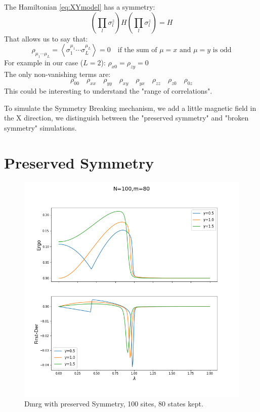 \documentclass[12pt,a4paper]{book}
\theoremstyle{definition}
\begin{document}
The Hamiltonian \ref{eq:XYmodel} has a symmetry:
\begin{equation}\label{eq:symm}\left(\prod_{l} \sigma_{l}^{z}\right) H\left(\prod_{l} \sigma_{l}^{z}\right)=H\end{equation}
That allows us to say that:
\begin{equation}\rho_{\mu_{1}\cdots  \mu_{L}}=\left\langle\sigma_{1}^{\mu_{1}}\cdots  \sigma_{L}^{\mu_{L}}\right\rangle=0 \quad \text{if the sum of $\mu=x$ and $\mu=y$ is odd}\end{equation}
For example in our case ($L=2$): $\rho_{x0}=\rho_{zy}=0$ \\
The only non-vanishing terms are:
\begin{equation}
	\rho_{00}\quad \rho_{xx} \quad \rho_{yy} \quad \rho_{xy} \quad \rho_{yx} \quad \rho_{zz}
	\quad \rho_{z0} \quad \rho_{0z}
\end{equation}
This could be interesting to understand the "range of correlations".

To simulate the Symmetry Breaking mechanism, we add a little magnetic field in the X direction, we distinguish between the "preserved symmetry" and "broken symmetry" simulations.

\section{Preserved Symmetry}


\begin{figure}[h]
	\centering
	\includegraphics[width=0.7\linewidth]{graphs/N100_m80_pressym_g_051015}
	\caption{Dmrg with preserved Symmetry, 100 sites, 80 states kept.}
	\label{fig:n100m80pressymg051015}
\end{figure}
\end{document}
